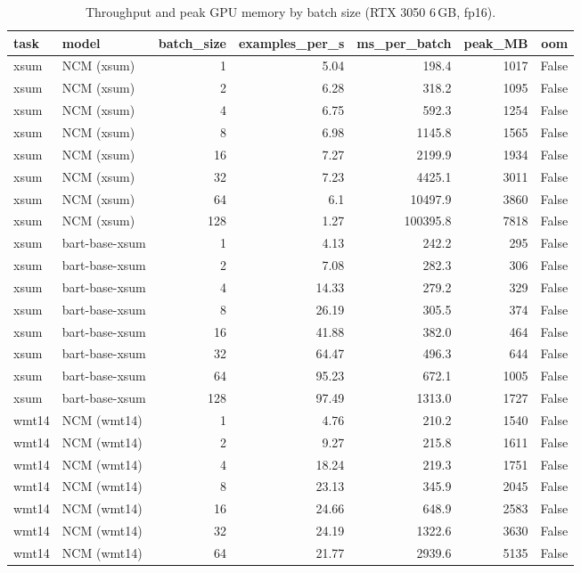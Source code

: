 \begin{table}[t]
\centering\small
\caption{Throughput and peak GPU memory by batch size (RTX 3050 6\,GB, fp16).}
\label{tab:batch_sweep}
\begin{tabular}{llrrrrr}
\toprule
task & model & batch\_size & examples\_per\_s & ms\_per\_batch & peak\_MB & oom \\
\midrule
xsum & NCM (xsum) & 1 & 5.04 & 198.4 & 1017 & False \\
xsum & NCM (xsum) & 2 & 6.28 & 318.2 & 1095 & False \\
xsum & NCM (xsum) & 4 & 6.75 & 592.3 & 1254 & False \\
xsum & NCM (xsum) & 8 & 6.98 & 1145.8 & 1565 & False \\
xsum & NCM (xsum) & 16 & 7.27 & 2199.9 & 1934 & False \\
xsum & NCM (xsum) & 32 & 7.23 & 4425.1 & 3011 & False \\
xsum & NCM (xsum) & 64 & 6.1 & 10497.9 & 3860 & False \\
xsum & NCM (xsum) & 128 & 1.27 & 100395.8 & 7818 & False \\
xsum & bart-base-xsum & 1 & 4.13 & 242.2 & 295 & False \\
xsum & bart-base-xsum & 2 & 7.08 & 282.3 & 306 & False \\
xsum & bart-base-xsum & 4 & 14.33 & 279.2 & 329 & False \\
xsum & bart-base-xsum & 8 & 26.19 & 305.5 & 374 & False \\
xsum & bart-base-xsum & 16 & 41.88 & 382.0 & 464 & False \\
xsum & bart-base-xsum & 32 & 64.47 & 496.3 & 644 & False \\
xsum & bart-base-xsum & 64 & 95.23 & 672.1 & 1005 & False \\
xsum & bart-base-xsum & 128 & 97.49 & 1313.0 & 1727 & False \\
wmt14 & NCM (wmt14) & 1 & 4.76 & 210.2 & 1540 & False \\
wmt14 & NCM (wmt14) & 2 & 9.27 & 215.8 & 1611 & False \\
wmt14 & NCM (wmt14) & 4 & 18.24 & 219.3 & 1751 & False \\
wmt14 & NCM (wmt14) & 8 & 23.13 & 345.9 & 2045 & False \\
wmt14 & NCM (wmt14) & 16 & 24.66 & 648.9 & 2583 & False \\
wmt14 & NCM (wmt14) & 32 & 24.19 & 1322.6 & 3630 & False \\
wmt14 & NCM (wmt14) & 64 & 21.77 & 2939.6 & 5135 & False \\

\end{tabular}
\end{table}
